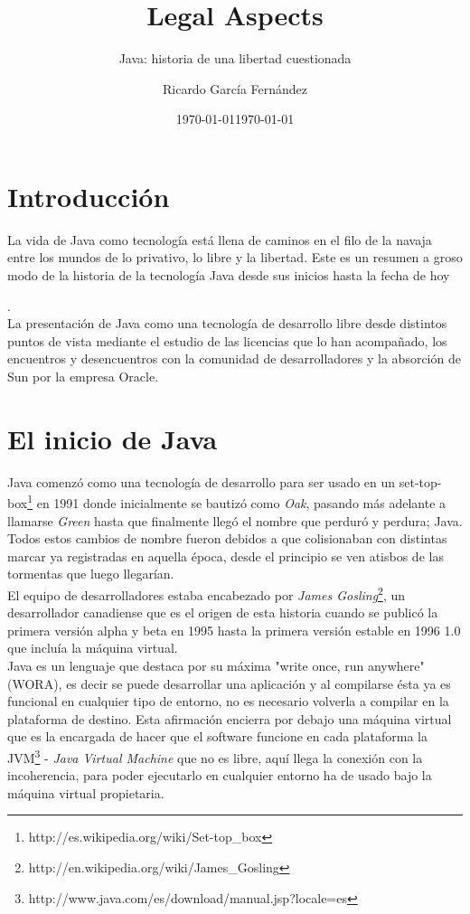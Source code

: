 \documentclass[11pt]{scrartcl}
\title{\textbf{Legal Aspects}}
\subtitle{Java: historia de una libertad cuestionada}
\author{Ricardo García Fernández}
\date{\today}
\begin{document}
\maketitle

\tableofcontents

\section{Introducción}

La vida de Java como tecnología está llena de caminos en el filo de la navaja entre los mundos de lo privativo, lo libre y la libertad. Este es un resumen a groso modo de la historia de la tecnología Java desde sus inicios hasta la fecha de hoy \date{\today}.\\
La presentación de Java como una tecnología de desarrollo libre desde distintos puntos de vista mediante el estudio de las licencias que lo han acompañado, los encuentros y desencuentros con la comunidad de desarrolladores y la absorción de Sun por la empresa Oracle.

\section{El inicio de Java}

Java comenzó como una tecnología de desarrollo para ser usado en un set-top-box\footnote{http://es.wikipedia.org/wiki/Set-top\_box} en 1991 donde inicialmente se bautizó como \emph{Oak}, pasando más adelante a llamarse \emph{Green} hasta que finalmente llegó el nombre que perduró y perdura; Java.
Todos estos cambios de nombre fueron debidos a que colisionaban con distintas marcar ya registradas en aquella época, desde el principio se ven atisbos de las tormentas que luego llegarían.\\
El equipo de desarrolladores estaba encabezado por \emph{James Gosling}\footnote{http://en.wikipedia.org/wiki/James\_Gosling}, un desarrollador canadiense que es el origen de esta historia cuando se publicó la primera versión alpha y beta en 1995 hasta la primera versión estable en 1996 1.0 que incluía la máquina virtual.\\
Java es un lenguaje que destaca por su máxima "write once, run anywhere" (WORA), es decir se puede desarrollar una aplicación y al compilarse ésta ya es funcional en cualquier tipo de entorno, no es necesario volverla a compilar en la plataforma de destino. Esta afirmación encierra por debajo una máquina virtual que es la encargada de hacer que el software funcione en cada plataforma la JVM\footnote{http://www.java.com/es/download/manual.jsp?locale=es} - \emph{Java Virtual Machine} que no es libre, aquí llega la conexión con la incoherencia, para poder ejecutarlo en cualquier entorno ha de usado bajo la máquina virtual propietaria.
\end{document}
